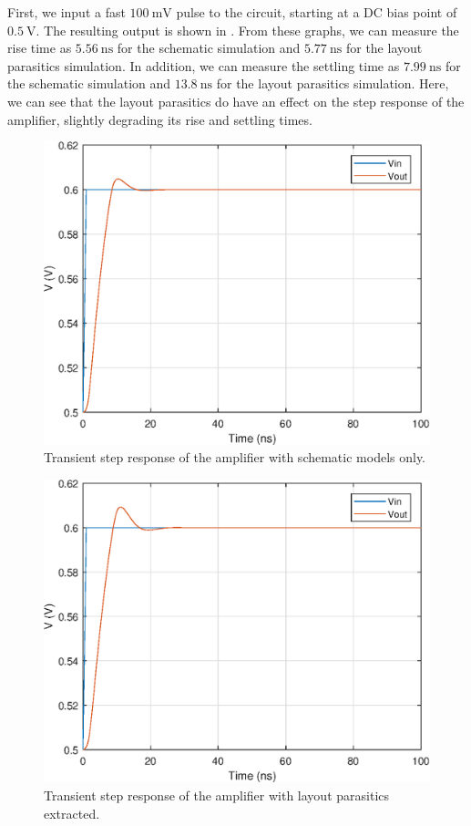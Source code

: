 \documentclass[journal,hidelinks]{IEEEtran}
\begin{document}
First, we input a fast $\SI{100}{\milli\volt}$ pulse to the circuit, starting at a DC bias point of $\SI{0.5}{\volt}$. The resulting output is shown in . From these graphs, we can measure the rise time as $\SI{5.56}{\nano\second}$ for the schematic simulation and $\SI{5.77}{\nano\second}$ for the layout parasitics simulation. In addition, we can measure the settling time as $\SI{7.99}{\nano\second}$ for the schematic simulation and $\SI{13.8}{\nano\second}$ for the layout parasitics simulation. Here, we can see that the layout parasitics do have an effect on the step response of the amplifier, slightly degrading its rise and settling times.

\begin{figure}[!htb]
  \centering
  \includegraphics[width=\columnwidth]{figures/schematic/tran_step.eps}
  \caption{Transient step response of the amplifier with schematic models only.}
  \label{fig:sch_tran_step}
\end{figure}

\begin{figure}[!htb]
  \centering
  \includegraphics[width=\columnwidth]{figures/layout/tran_step.eps}
  \caption{Transient step response of the amplifier with layout parasitics extracted.}
  \label{fig:lay_tran_step}
\end{figure}
\end{document}
